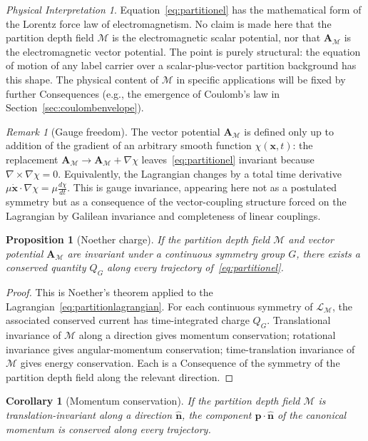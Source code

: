 \documentclass[11pt,twocolumn,a4paper]{article}
\theoremstyle{axiomstyle}
\theoremstyle{conseqstyle}
\newtheorem{proposition}{Proposition}
\newtheorem{corollary}{Corollary}
\theoremstyle{definition}
\theoremstyle{remark}
\newtheorem*{remark}{Remark}
\newtheorem*{interpretation}{Physical Interpretation}
\newcommand{\Depth}{\mathcal{M}}
\newcommand{\Apartition}{\bm{A}_{\Depth}}
\newcommand{\Lagr}{\mathcal{L}}
\begin{document}
\begin{interpretation}
Equation~\eqref{eq:partitionel} has the mathematical form of the Lorentz force law of electromagnetism. No claim is made here that the partition depth field $\Depth$ is the electromagnetic scalar potential, nor that $\Apartition$ is the electromagnetic vector potential. The point is purely structural: the equation of motion of any label carrier over a scalar-plus-vector partition background has this shape. The physical content of $\Depth$ in specific applications will be fixed by further Consequences (e.g., the emergence of Coulomb's law in Section~\ref{sec:coulombenvelope}).
\end{interpretation}

\begin{remark}[Gauge freedom]
The vector potential $\Apartition$ is defined only up to addition of the gradient of an arbitrary smooth function $\chi(\mathbf{x},t)$: the replacement $\Apartition\to\Apartition+\nabla\chi$ leaves~\eqref{eq:partitionel} invariant because $\nabla\times\nabla\chi=0$. Equivalently, the Lagrangian changes by a total time derivative $\mu\dot{\mathbf{x}}\cdot\nabla\chi=\mu\tfrac{d\chi}{dt}$. This is gauge invariance, appearing here not as a postulated symmetry but as a consequence of the vector-coupling structure forced on the Lagrangian by Galilean invariance and completeness of linear couplings.
\end{remark}

\begin{proposition}[Noether charge]
\label{prop:noether}
If the partition depth field $\Depth$ and vector potential $\Apartition$ are invariant under a continuous symmetry group $G$, there exists a conserved quantity $Q_{G}$ along every trajectory of~\eqref{eq:partitionel}.
\end{proposition}

\begin{proof}
This is Noether's theorem applied to the Lagrangian~\eqref{eq:partitionlagrangian}. For each continuous symmetry of $\Lagr_{\Depth}$, the associated conserved current has time-integrated charge $Q_{G}$. Translational invariance of $\Depth$ along a direction gives momentum conservation; rotational invariance gives angular-momentum conservation; time-translation invariance of $\Depth$ gives energy conservation. Each is a Consequence of the symmetry of the partition depth field along the relevant direction.
\end{proof}

\begin{corollary}[Momentum conservation]
\label{cor:momcon}
If the partition depth field $\Depth$ is translation-invariant along a direction $\hat{\mathbf{n}}$, the component $\mathbf{p}\cdot\hat{\mathbf{n}}$ of the canonical momentum is conserved along every trajectory.
\end{corollary}
\end{document}
